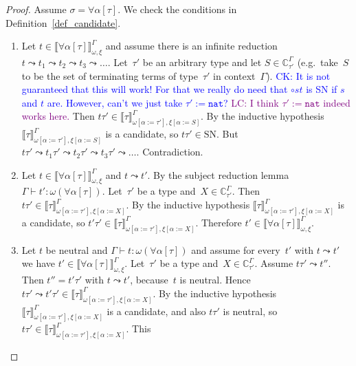 \documentclass[runningheads,a4paper]{llncs}
\newcommand{\subst}[2]{#1:=#2}
\newcommand{\nat}{\mathtt{nat}}
\newcommand{\SN}{\mathrm{SN}}
\newcommand{\Cb}{\mathbb{C}}
\newcommand{\val}[3]{\ensuremath{\llbracket#1\rrbracket_{#2}^{#3}}}
\newcommand{\proves}{\vdash}
\newcommand{\CK}[1]{\textcolor{blue}{CK: #1}}
\newcommand{\LC}[1]{\textcolor{purple}{LC: #1}}
\begin{document}
\begin{proof}
  Assume $\sigma = \forall\alpha[\tau]$. We check the conditions in
  Definition~\ref{def_candidate}.
  \begin{enumerate}
  \item Let $t \in \val{\forall\alpha[\tau]}{\omega,\xi}{\Gamma}$ and
    assume there is an infinite reduction
    $t \leadsto t_1 \leadsto t_2 \leadsto t_3 \leadsto
    \ldots$. Let~$\tau'$ be an arbitrary type and let
    $S \in \Cb_{\tau'}^\Gamma$ (e.g.~take~$S$ to be the set of
    terminating terms of type~$\tau'$ in context~$\Gamma$).
    \CK{It is not guaranteed that this will work! For that we really
    do need that $\circ s t$ is SN if $s$ and $t$ are.  However, can't
    we just take $\tau' := \nat$?} \LC{I think $\tau' := \nat$ indeed works here.}
    Then
    $t \tau' \in
    \val{\tau}{\omega[\subst{\alpha}{\tau'}],\xi[\subst{\alpha}{S}]}{\Gamma}$. By
    the inductive hypothesis
    $\val{\tau}{\omega[\subst{\alpha}{\tau'}],\xi[\subst{\alpha}{S}]}{\Gamma}$
    is a candidate, so $t \tau' \in \SN$. But
    $t \tau' \leadsto t_1 \tau' \leadsto t_2 \tau' \leadsto t_3 \tau'
    \leadsto \ldots$. Contradiction.
  \item Let $t \in \val{\forall\alpha[\tau]}{\omega,\xi}{\Gamma}$ and
    $t \leadsto t'$. By the subject reduction lemma
    $\Gamma \proves t' : \omega(\forall\alpha[\tau])$. Let~$\tau'$ be
    a type and~$X \in \Cb_{\tau'}^\Gamma$. Then
    $t \tau' \in
    \val{\tau}{\omega[\subst{\alpha}{\tau'}],\xi[\subst{\alpha}{X}]}{\Gamma}$. By
    the inductive hypothesis
    $\val{\tau}{\omega[\subst{\alpha}{\tau'}],\xi[\subst{\alpha}{X}]}{\Gamma}$
    is a candidate, so
    $t' \tau' \in
    \val{\tau}{\omega[\subst{\alpha}{\tau'}],\xi[\subst{\alpha}{X}]}{\Gamma}$. Therefore
    $t' \in \val{\forall\alpha[\tau]}{\omega,\xi}{\Gamma}$.
  \item Let $t$ be neutral and
    $\Gamma \proves t : \omega(\forall\alpha[\tau])$ and assume for
    every~$t'$ with $t \leadsto t'$ we have
    $t' \in
    \val{\forall\alpha[\tau]}{\omega,\xi}{\Gamma}$. Let~$\tau'$ be a
    type and~$X \in \Cb_{\tau'}^\Gamma$. Assume
    $t \tau' \leadsto t''$. Then $t'' = t' \tau'$ with
    $t \leadsto t'$, because~$t$ is neutral. Hence
    $t \tau' \leadsto t' \tau' \in
    \val{\tau}{\omega[\subst{\alpha}{\tau'}],\xi[\subst{\alpha}{X}]}{\Gamma}$. By
    the inductive
    hypothesis~$\val{\tau}{\omega[\subst{\alpha}{\tau'}],\xi[\subst{\alpha}{X}]}{\Gamma}$
    is a candidate, and also $t \tau'$ is neutral, so
    $t \tau' \in
    \val{\tau}{\omega[\subst{\alpha}{\tau'}],\xi[\subst{\alpha}{X}]}{\Gamma}$. This

\end{enumerate}
\end{proof}
\end{document}
